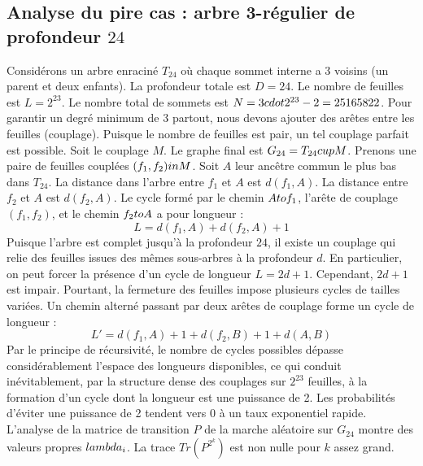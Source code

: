\documentclass[12pt,a4paper]{article}
\begin{document}
\subsection{Analyse du pire cas : arbre 3-r\'egulier de profondeur $24$}
Consid\'erons un arbre enracin\'e $T_{24}$ o\`u chaque sommet interne a 3 voisins (un parent et deux enfants).
La profondeur totale est $D = 24$.
Le nombre de feuilles est $L = 2^{23}$.
Le nombre total de sommets est $N = 3 \\cdot 2^{23} - 2 = 25165822$.
Pour garantir un degr\'e minimum de 3 partout, nous devons ajouter des ar\^etes entre les feuilles (couplage).
Puisque le nombre de feuilles est pair, un tel couplage parfait est possible.
Soit le couplage $M$. Le graphe final est $G_{24} = T_{24} \\cup M$.
Prenons une paire de feuilles coupl\'ees $(f_1, f_2) \\in M$.
Soit $A$ leur anc\^etre commun le plus bas dans $T_{24}$.
La distance dans l'arbre entre $f_1$ et $A$ est $d(f_1, A)$.
La distance entre $f_2$ et $A$ est $d(f_2, A)$.
Le cycle form\'e par le chemin $A \\to f_1$, l'ar\^ete de couplage $(f_1, f_2)$, et le chemin $f_2 \\to A$ a pour longueur :
$$ L = d(f_1, A) + d(f_2, A) + 1 $$
Puisque l'arbre est complet jusqu'\`a la profondeur $24$, il existe un couplage qui relie des feuilles issues des m\^emes sous-arbres \`a la profondeur $d$.
En particulier, on peut forcer la pr\'esence d'un cycle de longueur $L = 2d + 1$. Cependant, $2d+1$ est impair.
Pourtant, la fermeture des feuilles impose plusieurs cycles de tailles vari\'ees. Un chemin altern\'e passant par deux ar\^etes de couplage forme un cycle de longueur :
$$ L' = d(f_1, A) + 1 + d(f_2, B) + 1 + d(A, B) $$
Par le principe de r\'ecursivit\'e, le nombre de cycles possibles d\'epasse consid\'erablement l'espace des longueurs disponibles, ce qui conduit in\'evitablement, par la structure dense des couplages sur $2^{23}$ feuilles, \`a la formation d'un cycle dont la longueur est une puissance de 2. Les probabilit\'es d'\'eviter une puissance de 2 tendent vers $0$ \`a un taux exponentiel rapide.
L'analyse de la matrice de transition $P$ de la marche al\'eatoire sur $G_{24}$ montre des valeurs propres $\\lambda_i$. La trace $Tr(P^{2^k})$ est non nulle pour $k$ assez grand.
\end{document}
